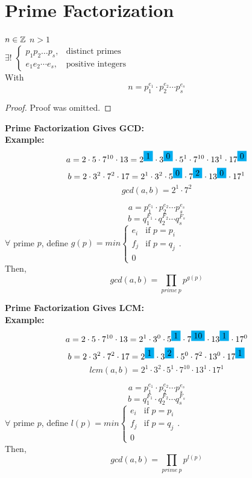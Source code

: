 \documentclass[openany]{report}
\begin{document}
\section{Prime Factorization}
\begin{theorem}
    $n \in \mathbb{Z}$ $n > 1$\\[1ex]
    $\exists!$ $\begin{cases}
        p_1 p_2 \dots p_s , &\text{distinct primes}\\
        e_1 e_2 \cdots e_s, &\text{positive integers}
    \end{cases}$ \\[1ex]
    With 
    $$n = p_1^{e_1} \cdot p_2^{e_2} \cdots p_s^{e_s}$$
\end{theorem}
\begin{proof}
    Proof was omitted.
\end{proof}
\noindent
\textbf{Prime Factorization Gives GCD:}\\

\textbf{Example:} 
$$a = 2 \cdot 5 \cdot 7^{10} \cdot 13 = 2^{\hlblue{1}} \cdot 3^{\hlblue{0}} \cdot 5^1 \cdot 7^{10} \cdot 13^1 \cdot 17^{\hlblue{0}}$$
$$b = 2 \cdot 3^2 \cdot 7^2 \cdot 17 = 2^1 \cdot 3^2 \cdot 5^{\hlblue{0}} \cdot 7^{\hlblue{2}} \cdot 13^{\hlblue{0}} \cdot 17^1$$
$$gcd(a,b) = 2^1 \cdot 7^2$$

$$a = p_1^{e_1} \cdot p_2^{e_2} \cdots p_s^{e_s}$$
$$b = q_1^{F_1} \cdot q_2^{F_2} \cdots q_s^{F_s}$$
$\forall$ prime $p$, define $g(p) = min\begin{cases}
    e_i &\text{if $p = p_i$}\\
    f_j &\text{if $p = q_j$}\\
    0
\end{cases}$.\\
Then, 
$$gcd(a,b) = \prod_{prime \ p} p^{g(p)}$$ 

\noindent
\textbf{Prime Factorization Gives LCM:}\\

\textbf{Example:} 
$$a = 2 \cdot 5 \cdot 7^{10} \cdot 13 = 2^1 \cdot 3^0 \cdot 5^{\hlblue{1}} \cdot 7^{\hlblue{10}} \cdot 13^{\hlblue{1}} \cdot 17^0$$
$$b = 2 \cdot 3^2 \cdot 7^2 \cdot 17 = 2^{\hlblue{1}} \cdot 3^{\hlblue{2}} \cdot 5^0 \cdot 7^2 \cdot 13^0 \cdot 17^{\hlblue{1}}$$
$$lcm(a,b) = 2^1 \cdot 3^2 \cdot 5^1 \cdot 7^{10} \cdot 13^1 \cdot 17^1$$

$$a = p_1^{e_1} \cdot p_2^{e_2} \cdots p_s^{e_s}$$
$$b = q_1^{F_1} \cdot q_2^{F_2} \cdots q_s^{F_s}$$
$\forall$ prime $p$, define $l(p) = min\begin{cases}
    e_i &\text{if $p = p_i$}\\
    f_j &\text{if $p = q_j$}\\
    0
\end{cases}$.\\
Then, 
$$gcd(a,b) = \prod_{prime \ p} p^{l(p)}$$ 
\end{document}
